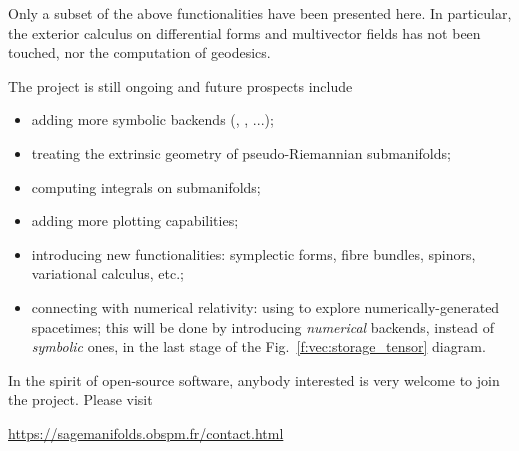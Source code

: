 Only a subset of the above functionalities have been presented here. In particular,
the exterior calculus on differential forms and multivector fields has not been
touched, nor the computation of geodesics.

\medskip

The  project is still ongoing and future prospects include
\begin{itemize}
\item adding more symbolic backends (, , ...);
\item treating the extrinsic geometry of pseudo-Riemannian submanifolds;
\item computing integrals on submanifolds;
\item adding more plotting capabilities;
\item introducing new functionalities: symplectic forms, fibre bundles,
spinors, variational calculus, etc.;
\item connecting with numerical relativity: using \Sage{} to explore
numerically-generated spacetimes; this will be done by introducing
\emph{numerical} backends, instead
of \emph{symbolic} ones, in the last stage of the Fig.~\ref{f:vec:storage_tensor}
diagram.
\end{itemize}
In the spirit of open-source software, anybody interested is very welcome
to join the project. Please visit
\begin{center}
\url{https://sagemanifolds.obspm.fr/contact.html}
\end{center}

